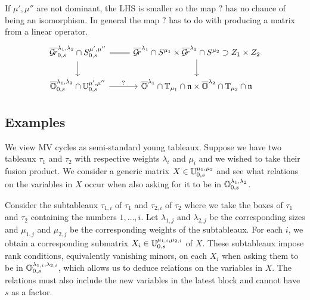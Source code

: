 \documentclass[draft]{article}
\begin{document}
\begin{question}
    If $\mu',\mu''$ are not dominant, the LHS is smaller so the map $?$ has no chance of being an isomorphism. In general the map $?$ has to do with producing a matrix from a linear operator. 
    \[
    \begin{tikzcd}
        \overline\Gr^{\lambda_1,\lambda_2}_{0,s}\cap S^{\mu',\mu''}_{0,s} \ar[r,equals]\ar[d] & \overline\Gr^{\lambda_1} \cap S^{\mu_1} \times \overline\Gr^{\lambda_2} \cap S^{\mu_2} \supset Z_1 \times Z_2 \ar[d]\\
        \overline\OO^{\lambda_1,\lambda_2}_{0,s} \cap \UU^{\mu',\mu''}_{0,s} \ar[r,"?"] & \overline\OO^{\lambda_1}\cap \TT_{\mu_1}\cap \n \times \overline\OO^{\lambda_2}\cap \TT_{\mu_2}\cap \n
    \end{tikzcd}    
    \]
\end{question}

\subsection{Examples}


We view MV cycles as semi-standard young tableaux. Suppose we have two tableaux $\tau_1$ and $\tau_2$ with respective weights $\lambda_i$ and $\mu_i$ and we wished to take their fusion product. We consider a generic matrix $X \in \mathbb U^{\mu_1,\mu_2}_{0,s}$ and see what relations on the variables in $X$ occur when also asking for it to be in $\mathbb O^{\lambda_1,\lambda_2}_{0,s}$. 

Consider the subtableaux $\tau_{1,i}$ of $\tau_1$ and $\tau_{2,i}$ of $\tau_2$ where we take the boxes of $\tau_1$ and $\tau_2$ containing the numbers $1,\dots,i$. Let $\lambda_{1,j}$ and $\lambda_{2,j}$ be the corresponding sizes and $\mu_{1,j}$ and $\mu_{2,j}$ be the corresponding weights of the subtableaux. For each $i$, we obtain a corresponding submatrix $X_i \in \mathbb U^{\mu_{1,i}, \mu_{2,i}}_{0,s}$ of $X$. These subtableaux impose rank conditions, equivalently vanishing minors, on each $X_i$ when asking them to be in $\mathbb O^{\lambda_{1,i}, \lambda_{2,i}}_{0,s}$, which allows us to deduce relations on the variables in $X$. The relations must also include the new variables in the latest block and cannot have $s$ as a factor.
\end{document}
